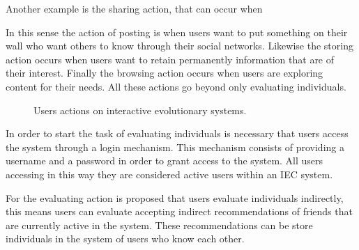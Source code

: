 \documentclass[conference]{IEEEtran}
\begin{document}
Another example is the sharing action, that can occur when %

In this sense the action of posting is when
users want to put something on their wall who want others to know through
their social networks. Likewise the storing action occurs when users want to
retain permanently information that are of their interest. Finally the
browsing action occurs when users are exploring content for their needs. All
these actions go beyond only evaluating individuals.

\begin{figure}
  \captionsetup{justification=centering,margin=2cm}
  \centering
  \setlength\fboxsep{0pt}
  \setlength\fboxrule{0.7pt}
  \caption{Users actions on interactive evolutionary systems.}
  \label{fig:users}       
\end{figure}

In order to start the task of evaluating individuals is necessary that users
access the system through a login mechanism. This mechanism consists of
providing a username and a password in order to grant access to the system. All
users accessing in this way they are considered active users within an IEC
system.

For the evaluating action is proposed  that users evaluate individuals
indirectly, this means users can evaluate accepting indirect recommendations of
friends that are currently active in the system. These recommendations can be
store individuals in the system of users who know each other.
\end{document}
